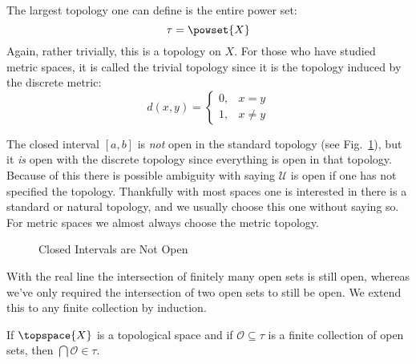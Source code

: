 \documentclass{book}                                                           %
\begin{document}
                \begin{example}
                    The largest topology one can define is the entire power set:
                    \begin{equation}
                        \tau=\powset{X}
                    \end{equation}
                    Again, rather trivially, this is a topology on $X$. For
                    those who have studied metric spaces, it is called the
                    trivial topology since it is the topology induced by the
                    discrete metric:%
                    \begin{equation}
                        d(x,y)=
                        \begin{cases}
                            0,&x=y\\
                            1,&x\ne{y}
                        \end{cases}
                    \end{equation}
                \end{example}
                The closed interval $[a,b]$ is \textit{not} open in the standard
                topology (see Fig.~\ref{fig:Closed_Interval_Not_Open}), but it
                \textit{is} open with the discrete topology since everything is
                open in that topology. Because of this there is possible
                ambiguity with saying $\mathcal{U}$ is open if one has not
                specified the topology. Thankfully with most spaces one is
                interested in there is a standard or natural topology, and we
                usually choose this one without saying so. For metric spaces we
                almost always choose the metric topology.
                \begin{figure}[H]
                    \centering
                    \captionsetup{type=figure}
                    
                    \caption{Closed Intervals are Not Open}
                    \label{fig:Closed_Interval_Not_Open}
                \end{figure}
                With the real line the intersection of finitely many open sets
                is still open, whereas we've only required the intersection of
                two open sets to still be open. We extend this to any finite
                collection by induction.
                \begin{theorem}
                    \label{thm:Finite_Intersections_Is_Open}%
                    If $\topspace{X}$ is a topological space and if
                    $\mathcal{O}\subseteq\tau$ is a finite collection of open
                    sets, then $\bigcap\mathcal{O}\in\tau$.
                \end{theorem}
\end{document}
